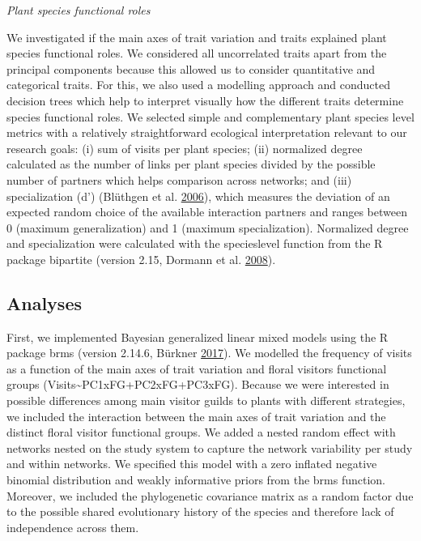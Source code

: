 \documentclass[11pt,a4paper,]{article}
\begin{document}
\emph{Plant species functional roles}

We investigated if the main axes of trait variation and traits explained
plant species functional roles. We considered all uncorrelated traits
apart from the principal components because this allowed us to consider
quantitative and categorical traits. For this, we also used a modelling
approach and conducted decision trees which help to interpret visually
how the different traits determine species functional roles. We selected
simple and complementary plant species level metrics with a relatively
straightforward ecological interpretation relevant to our research
goals: (i) sum of visits per plant species; (ii) normalized degree
calculated as the number of links per plant species divided by the
possible number of partners which helps comparison across networks; and
(iii) specialization (d') (Blüthgen et al.
\protect\hyperlink{ref-bluthgen2006}{2006}), which measures the
deviation of an expected random choice of the available interaction
partners and ranges between 0 (maximum generalization) and 1 (maximum
specialization). Normalized degree and specialization were calculated
with the specieslevel function from the R package bipartite (version
2.15, Dormann et al. \protect\hyperlink{ref-dormann2008}{2008}).

\subsection{Analyses}\label{analyses}

First, we implemented Bayesian generalized linear mixed models using the
R package brms (version 2.14.6, Bürkner
\protect\hyperlink{ref-burkner2017}{2017}). We modelled the frequency of
visits as a function of the main axes of trait variation and floral
visitors functional groups
(Visits\textasciitilde{}PC1xFG+PC2xFG+PC3xFG). Because we were
interested in possible differences among main visitor guilds to plants
with different strategies, we included the interaction between the main
axes of trait variation and the distinct floral visitor functional
groups. We added a nested random effect with networks nested on the
study system to capture the network variability per study and within
networks. We specified this model with a zero inflated negative binomial
distribution and weakly informative priors from the brms function.
Moreover, we included the phylogenetic covariance matrix as a random
factor due to the possible shared evolutionary history of the species
and therefore lack of independence across them.
\end{document}
